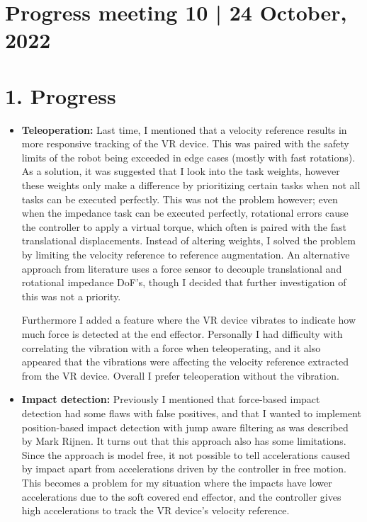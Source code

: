 \documentclass[11pt]{report}
\numberwithin{equation}{section}        %
\numberwithin{figure}{section}          %
\numberwithin{table}{section}           %
\begin{document}
  \section*{Progress meeting 10 | 24 October, 2022}


  \section*{1. Progress}
  \begin{itemize}
  \item \textbf{Teleoperation:} Last time, I mentioned that a velocity reference results in more responsive tracking of the VR device. This was paired with the safety limits of the robot being exceeded in edge cases (mostly with fast rotations). As a solution, it was suggested that I look into the task weights, however these weights only make a difference by prioritizing certain tasks when not all tasks can be executed perfectly. This was not the problem however; even when the impedance task can be executed perfectly, rotational errors cause the controller to apply a virtual torque, which often is paired with the fast translational displacements. Instead of altering weights, I solved the problem by limiting the velocity reference to  reference augmentation. An alternative approach from literature uses a force sensor to decouple translational and rotational impedance DoF's, though I decided that further investigation of this was not a priority.

  Furthermore I added a feature where the VR device vibrates to indicate how much force is detected at the end effector. Personally I had difficulty with correlating the vibration with a force when teleoperating, and it also appeared that the vibrations were affecting the velocity reference extracted from the VR device. Overall I prefer teleoperation without the vibration.
    
  \item \textbf{Impact detection:} Previously I mentioned that force-based impact detection had some flaws with false positives, and that I wanted to implement position-based impact detection with jump aware filtering as was described by Mark Rijnen. It turns out that this approach also has some limitations. Since the approach is model free, it not possible to tell accelerations caused by impact apart from accelerations driven by the controller in free motion. This becomes a problem for my situation where the impacts have lower accelerations due to the soft covered end effector, and the controller gives high accelerations to track the VR device's velocity reference.


\end{itemize}
\end{document}

